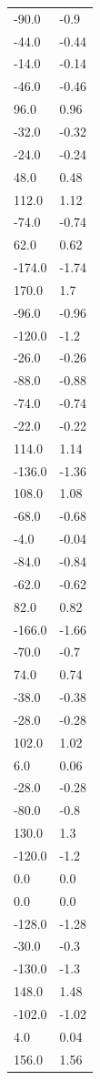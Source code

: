 \begin{longtable}{ll}
-90.0 & -0.9 \\
-44.0 & -0.44 \\
-14.0 & -0.14 \\
-46.0 & -0.46 \\
96.0 & 0.96 \\
-32.0 & -0.32 \\
-24.0 & -0.24 \\
48.0 & 0.48 \\
112.0 & 1.12 \\
-74.0 & -0.74 \\
62.0 & 0.62 \\
-174.0 & -1.74 \\
170.0 & 1.7 \\
-96.0 & -0.96 \\
-120.0 & -1.2 \\
-26.0 & -0.26 \\
-88.0 & -0.88 \\
-74.0 & -0.74 \\
-22.0 & -0.22 \\
114.0 & 1.14 \\
-136.0 & -1.36 \\
108.0 & 1.08 \\
-68.0 & -0.68 \\
-4.0 & -0.04 \\
-84.0 & -0.84 \\
-62.0 & -0.62 \\
82.0 & 0.82 \\
-166.0 & -1.66 \\
-70.0 & -0.7 \\
74.0 & 0.74 \\
-38.0 & -0.38 \\
-28.0 & -0.28 \\
102.0 & 1.02 \\
6.0 & 0.06 \\
-28.0 & -0.28 \\
-80.0 & -0.8 \\
130.0 & 1.3 \\
-120.0 & -1.2 \\
0.0 & 0.0 \\
0.0 & 0.0 \\
-128.0 & -1.28 \\
-30.0 & -0.3 \\
-130.0 & -1.3 \\
148.0 & 1.48 \\
-102.0 & -1.02 \\
4.0 & 0.04 \\
156.0 & 1.56 \\

\end{longtable}
